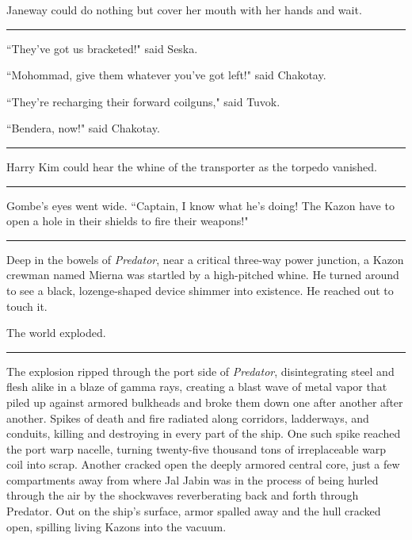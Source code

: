 \documentclass[twoside,letterpaper,12pt]{memoir}
\begin{document}
Janeway could do nothing but cover her mouth with her hands and wait.

\begin{center}\rule{3cm}{0.4 pt}\end{center}

``They've got us bracketed!" said Seska.

``Mohommad, give them whatever you've got left!" said Chakotay.

``They're recharging their forward coilguns," said Tuvok.

``Bendera, now!" said Chakotay.

\begin{center}\rule{3cm}{0.4 pt}\end{center}

Harry Kim could hear the whine of the transporter as the torpedo vanished.

\begin{center}\rule{3cm}{0.4 pt}\end{center}

Gombe's eyes went wide. ``Captain, I know what he's doing! The Kazon have to open a hole in their shields to fire their weapons!"

\begin{center}\rule{3cm}{0.4 pt}\end{center}

Deep in the bowels of \textit{Predator}, near a critical three-way power junction, a Kazon crewman named Mierna was startled by a high-pitched whine. He turned around to see a black, lozenge-shaped device shimmer into existence. He reached out to touch it.

The world exploded.

\begin{center}\rule{3cm}{0.4 pt}\end{center}

The explosion ripped through the port side of \textit{Predator}, disintegrating steel and flesh alike in a blaze of gamma rays, creating a blast wave of metal vapor that piled up against armored bulkheads and broke them down one after another after another. Spikes of death and fire radiated along corridors, ladderways, and conduits, killing and destroying in every part of the ship. One such spike reached the port warp nacelle, turning twenty-five thousand tons of irreplaceable warp coil into scrap. Another cracked open the deeply armored central core, just a few compartments away from where Jal Jabin was in the process of being hurled through the air by the shockwaves reverberating back and forth through Predator. Out on the ship's surface, armor spalled away and the hull cracked open, spilling living Kazons into the vacuum.
\end{document}
